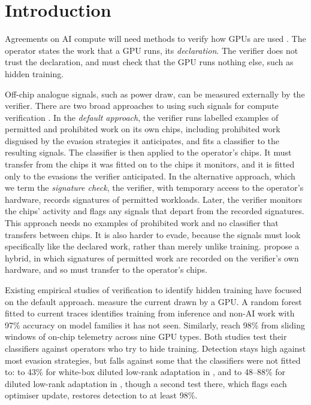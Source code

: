 \documentclass{article}
\begin{document}
\section{Introduction}\label{s:intro}

Agreements on AI compute will need methods to verify how GPUs are used \citep{shavit2023,baker2025}. The operator states the work that a GPU runs, its
\emph{declaration}. The verifier does not trust the declaration, and must check that
the GPU runs nothing else, such as hidden training. 

Off-chip analogue signals, such as power draw, can be measured externally by the verifier. There are two broad approaches to using such signals for compute verification \citep{scher2025}. In the \emph{default approach}, the verifier runs labelled examples of permitted and
prohibited work on its own chips, including prohibited work disguised by the evasion
strategies it anticipates, and fits a classifier to the resulting signals. The classifier
is then applied to the operator's chips. It must transfer from the chips it was fitted on
to the chips it monitors, and it is fitted only to the evasions the verifier anticipated. In the alternative approach, which we term the \emph{signature check}, the verifier, with temporary access to the operator's hardware, records signatures of permitted workloads. Later, the verifier monitors the chips' activity and flags any signals that depart from the recorded signatures. This approach needs no examples of prohibited work and no classifier that transfers
between chips. It is also harder to evade, because the signals must look specifically like the declared
work, rather than merely unlike training. \citet{baker2025} propose a hybrid, in which signatures
of permitted work are recorded on the verifier's own hardware, and so must transfer to the
operator's chips.


Existing empirical studies of verification to identify hidden training have focused on the default approach.
\citet{gargiulo2026}
measure the current drawn by a GPU. A random forest fitted to current traces identifies
training from inference and non-AI work with 97\% accuracy on model families it has
not seen. Similarly, \citet{rahman2026} reach 98\% from sliding windows of on-chip telemetry
across nine GPU types. Both studies test their classifiers against operators who try to
hide training. Detection stays high against most evasion strategies, but falls against some that
the classifiers were not fitted to: to 43\% for white-box diluted low-rank adaptation in
\citet{rahman2026}, and to 48--88\% for diluted low-rank adaptation in
\citet{gargiulo2026}, though a second test there, which flags each optimiser update,
restores detection to at least 98\%.
\end{document}
